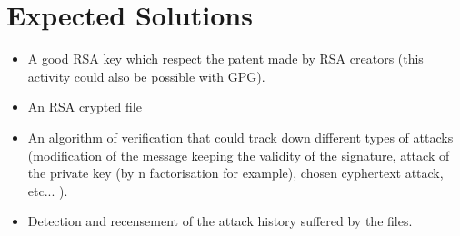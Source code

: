 \documentclass[a4paper, 11pt]{article}
\theoremstyle{definition}
\begin{document}
\section{Expected Solutions}
	\begin{itemize}
	\item A good RSA key which respect the patent made by RSA creators (this activity could also be possible with GPG).  
	\item An RSA crypted file
	\item An algorithm of verification that could track down different types of attacks (modification of the message keeping the validity of the signature, attack of the private key (by n factorisation for example), chosen cyphertext attack, etc... ).	
	\item Detection and recensement of the attack history suffered by the files.
	
	\end{itemize}



\end{document}
